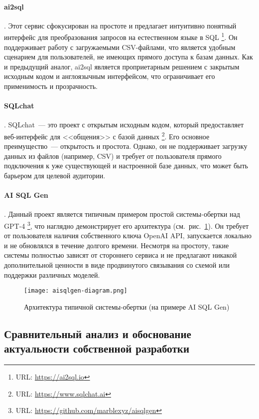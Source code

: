 \paragraph{ai2sql}. Этот сервис сфокусирован на простоте и предлагает интуитивно
понятный интерфейс для преобразования запросов на естественном языке в SQL
\footnote{URL: \url{https://ai2sql.io}}. Он поддерживает работу с загружаемыми CSV-файлами,
что является удобным сценарием для пользователей, не имеющих прямого доступа к базам данных.
Как и предыдущий аналог, ai2sql является проприетарным решением с закрытым исходным кодом и
англоязычным интерфейсом, что ограничивает его применимость и прозрачность.

\paragraph{SQLchat}. SQLchat~--- это проект с открытым исходным кодом,
который предоставляет веб-интерфейс для <<общения>> с базой данных
\footnote{URL: \url{https://www.sqlchat.ai}}. Его основное преимущество~--- открытость и простота.
Однако, он не поддерживает загрузку данных из файлов (например, CSV) и требует от пользователя
прямого подключения к уже существующей и настроенной базе данных, что может быть барьером для
целевой аудитории.

\paragraph{AI SQL Gen}. Данный проект является типичным примером простой системы-обертки над
GPT-4 \footnote{URL: \url{https://github.com/marblexyz/aisqlgen}}, что наглядно демонстрирует его
архитектура (см.~рис.~\ref{fig:aisqlgen_arch}). Он требует от пользователя
наличия собственного ключа OpenAI API, запускается локально и не обновлялся в течение долгого
времени. Несмотря на простоту, такие системы полностью зависят от стороннего сервиса и не
предлагают никакой дополнительной ценности в виде продвинутого связывания со схемой или
поддержки различных моделей.

\begin{figure}[ht]
	\begin{center}
		\texttt{[image: aisqlgen-diagram.png]}
	\end{center}
	\caption{Архитектура типичной системы-обертки (на примере AI SQL Gen)}
	\label{fig:aisqlgen_arch}
\end{figure}

\subsection{Сравнительный анализ и обоснование актуальности собственной разработки}

